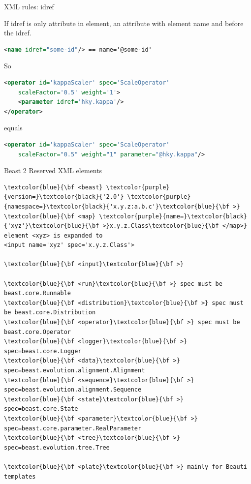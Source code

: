 \documentclass{beamer}
\theoremstyle{definition}
\begin{document}
\begin{frame}[containsverbatim]{XML rules: idref}

If idref is only attribute in element, an attribute with element
name and \@ before the idref.

\begin{lstlisting}[language=XML]
<name idref="some-id"/> == name='@some-id'
\end{lstlisting}

So

{\small
\begin{lstlisting}[language=XML]
<operator id='kappaScaler' spec='ScaleOperator' 
    scaleFactor='0.5' weight='1'>
    <parameter idref='hky.kappa'/>
</operator>
\end{lstlisting}
}

equals

{\small
\begin{lstlisting}[language=XML]
<operator id='kappaScaler' spec='ScaleOperator' 
    scaleFactor="0.5" weight="1" parameter="@hky.kappa"/>
\end{lstlisting}
}
\end{frame}


\begin{frame}[containsverbatim]{Beast 2 Reserved XML elements}

{\small
\begin{Verbatim}[commandchars=\\\{\}]
\textcolor{blue}{\bf <beast} \textcolor{purple}{version=}\textcolor{black}{'2.0'} \textcolor{purple}{namespace=}\textcolor{black}{'x.y.z:a.b.c'}\textcolor{blue}{\bf >}
\textcolor{blue}{\bf <map} \textcolor{purple}{name=}\textcolor{black}{'xyz'}\textcolor{blue}{\bf >}x.y.z.Class\textcolor{blue}{\bf </map>}
element <xyz> is expanded to 
<input name='xyz' spec='x.y.z.Class'>

\textcolor{blue}{\bf <input}\textcolor{blue}{\bf >}

\textcolor{blue}{\bf <run}\textcolor{blue}{\bf >} spec must be beast.core.Runnable
\textcolor{blue}{\bf <distribution}\textcolor{blue}{\bf >} spec must be beast.core.Distribution
\textcolor{blue}{\bf <operator}\textcolor{blue}{\bf >} spec must be beast.core.Operator
\textcolor{blue}{\bf <logger}\textcolor{blue}{\bf >}    spec=beast.core.Logger
\textcolor{blue}{\bf <data}\textcolor{blue}{\bf >}      spec=beast.evolution.alignment.Alignment
\textcolor{blue}{\bf <sequence}\textcolor{blue}{\bf >}  spec=beast.evolution.alignment.Sequence
\textcolor{blue}{\bf <state}\textcolor{blue}{\bf >}     spec=beast.core.State
\textcolor{blue}{\bf <parameter}\textcolor{blue}{\bf >} spec=beast.core.parameter.RealParameter
\textcolor{blue}{\bf <tree}\textcolor{blue}{\bf >}      spec=beast.evolution.tree.Tree

\textcolor{blue}{\bf <plate}\textcolor{blue}{\bf >} mainly for Beauti templates
\end{Verbatim}
}
\end{frame}
\end{document}
